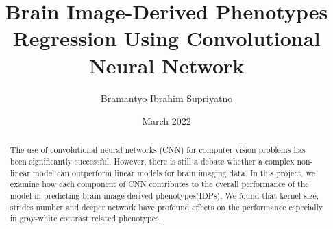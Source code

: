 \documentclass[12pt, letterpaper, oneside]{article}
\title{Brain Image-Derived Phenotypes Regression Using Convolutional Neural Network}
\author{Bramantyo Ibrahim Supriyatno}
\date{March 2022}
\begin{document}
    \begin{abstract}
        The use of convolutional neural networks (CNN) for computer vision problems has been significantly successful. 
        However, there is still a debate whether a complex non-linear model can outperform linear models for brain imaging data. 
        In this project, we examine how each component of CNN contributes to the overall performance of the model in predicting brain image-derived phenotypes(IDPs). 
        We found that kernel size, strides number and deeper network have profound effects on the performance especially in gray-white contrast related phenotypes. 
    \end{abstract}
\end{document}
